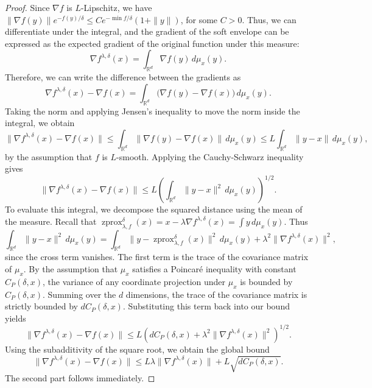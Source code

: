 \documentclass{article}
\newcommand{\zprox}{\ensuremath{\operatorname{zprox}}}
\begin{document}
\begin{proof}
Since $\nabla f$ is $L$-Lipschitz, we have $\|\nabla f(y)\|e^{-f(y)/\delta}\leq C e^{-\min f/\delta}(1+\|y\|)$, for some $C>0$. Thus, we can differentiate under the integral, and the gradient of the soft envelope can be expressed as the expected gradient of the original function under this measure:
$$ \nabla f^{\lambda,\delta}(x) = \int_{\mathbb{R}^d} \nabla f(y) \, d\mu_x(y) . $$
Therefore, we can write the difference between the gradients as
$$ \nabla f^{\lambda,\delta}(x) - \nabla f(x) = \int_{\mathbb{R}^d} \big(\nabla f(y) - \nabla f(x)\big) \, d\mu_x(y) . $$
Taking the norm and applying Jensen's inequality to move the norm inside the integral, we obtain
$$ \|\nabla f^{\lambda,\delta}(x) - \nabla f(x)\| \leq \int_{\mathbb{R}^d} \|\nabla f(y) - \nabla f(x)\| \, d\mu_x(y) \leq L \int_{\mathbb{R}^d} \|y-x\| \, d\mu_x(y) , $$
by the assumption that $f$ is $L$-smooth. Applying the Cauchy-Schwarz inequality gives
$$ \|\nabla f^{\lambda,\delta}(x) - \nabla f(x)\| \leq L \left( \int_{\mathbb{R}^d} \|y-x\|^2 \, d\mu_x(y) \right)^{1/2} . $$
To evaluate this integral, we decompose the squared distance using the mean of the measure. Recall that $\zprox_{\lambda, f}^\delta(x) = x - \lambda \nabla f^{\lambda,\delta}(x) = \int y \, d\mu_x(y)$. Thus
$$ \int_{\mathbb{R}^d} \|y-x\|^2 \, d\mu_x(y) = \int_{\mathbb{R}^d} \|y - \zprox_{\lambda, f}^\delta(x)\|^2 \, d\mu_x(y) + \lambda^2\|\nabla f^{\lambda,\delta}(x)\|^2 , $$
since the cross term vanishes. The first term is the trace of the covariance matrix of $\mu_x$. By the assumption that $\mu_x$ satisfies a Poincaré inequality with constant $C_P(\delta, x)$, the variance of any coordinate projection under $\mu_x$ is bounded by $C_P(\delta, x)$. Summing over the $d$ dimensions, the trace of the covariance matrix is strictly bounded by $d C_P(\delta, x)$. Substituting this term back into our bound yields
$$ \|\nabla f^{\lambda,\delta}(x) - \nabla f(x)\| \leq L \left( d C_P(\delta, x) + \lambda^2 \|\nabla f^{\lambda,\delta}(x)\|^2 \right)^{1/2} . $$
Using the subadditivity of the square root, we obtain the global bound
$$ \|\nabla f^{\lambda,\delta}(x) - \nabla f(x)\| \leq L\lambda \|\nabla f^{\lambda,\delta}(x)\| + L\sqrt{d C_P(\delta, x)} . $$
The second part follows immediately.
\end{proof}
\end{document}
